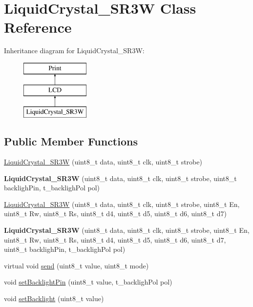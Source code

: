\hypertarget{class_liquid_crystal___s_r3_w}{}\section{Liquid\+Crystal\+\_\+\+S\+R3\+W Class Reference}
\label{class_liquid_crystal___s_r3_w}
Inheritance diagram for Liquid\+Crystal\+\_\+\+S\+R3\+W\+:\begin{figure}[H]
\begin{center}
\leavevmode
\includegraphics[height=3.000000cm]{class_liquid_crystal___s_r3_w}
\end{center}
\end{figure}
\subsection*{Public Member Functions}
\begin{DoxyCompactItemize}
\item 
\hyperlink{class_liquid_crystal___s_r3_w_ae1396bcd5e9c5b7ed13182c166de776b}{Liquid\+Crystal\+\_\+\+S\+R3\+W} (uint8\+\_\+t data, uint8\+\_\+t clk, uint8\+\_\+t strobe)
\item 
\hypertarget{class_liquid_crystal___s_r3_w_a7b2f382b76bc9d88adb8d681e824b4de}{}{\bfseries Liquid\+Crystal\+\_\+\+S\+R3\+W} (uint8\+\_\+t data, uint8\+\_\+t clk, uint8\+\_\+t strobe, uint8\+\_\+t backligh\+Pin, t\+\_\+backligh\+Pol pol)\label{class_liquid_crystal___s_r3_w_a7b2f382b76bc9d88adb8d681e824b4de}

\item 
\hyperlink{class_liquid_crystal___s_r3_w_a4fab8ff2f21bba3efd133cd8c87fffc0}{Liquid\+Crystal\+\_\+\+S\+R3\+W} (uint8\+\_\+t data, uint8\+\_\+t clk, uint8\+\_\+t strobe, uint8\+\_\+t En, uint8\+\_\+t Rw, uint8\+\_\+t Rs, uint8\+\_\+t d4, uint8\+\_\+t d5, uint8\+\_\+t d6, uint8\+\_\+t d7)
\item 
\hypertarget{class_liquid_crystal___s_r3_w_a24f051747dfeda48f7b207c3358c8015}{}{\bfseries Liquid\+Crystal\+\_\+\+S\+R3\+W} (uint8\+\_\+t data, uint8\+\_\+t clk, uint8\+\_\+t strobe, uint8\+\_\+t En, uint8\+\_\+t Rw, uint8\+\_\+t Rs, uint8\+\_\+t d4, uint8\+\_\+t d5, uint8\+\_\+t d6, uint8\+\_\+t d7, uint8\+\_\+t backligh\+Pin, t\+\_\+backligh\+Pol pol)\label{class_liquid_crystal___s_r3_w_a24f051747dfeda48f7b207c3358c8015}

\item 
virtual void \hyperlink{class_liquid_crystal___s_r3_w_ade34af5b7fe795482f1848c2176d6e56}{send} (uint8\+\_\+t value, uint8\+\_\+t mode)
\item 
void \hyperlink{class_liquid_crystal___s_r3_w_a894d0ea8ea61c1d15acd8a26d417e477}{set\+Backlight\+Pin} (uint8\+\_\+t value, t\+\_\+backligh\+Pol pol)
\item 
void \hyperlink{class_liquid_crystal___s_r3_w_a6d0fc7907ef9fd87c408a21b9bd49295}{set\+Backlight} (uint8\+\_\+t value)
\end{DoxyCompactItemize}
